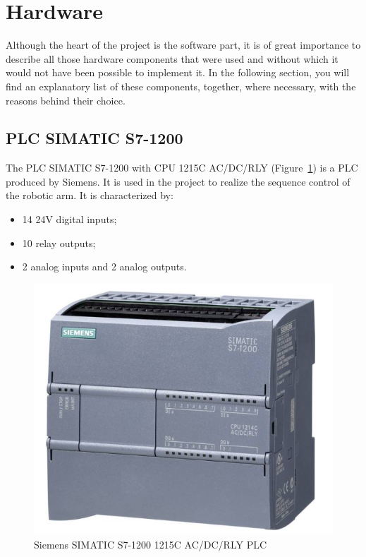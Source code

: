 \documentclass[a4paper,11pt]{report}
\theoremstyle{definition}
\theoremstyle{plain}
\begin{document}
    \section{Hardware}
        Although the heart of the project is the software part, it is of great importance to describe all those hardware components that were used and without which it would not have been possible to implement it. In the following section, you will find an explanatory list of these components, together, where necessary, with the reasons behind their choice.
        \subsection{PLC SIMATIC S7-1200}
            The PLC SIMATIC S7-1200 with CPU 1215C AC/DC/RLY (Figure~\ref{plc}) is a PLC produced by Siemens. It is used in the project to realize the sequence control of the robotic arm.
            It is characterized by:
            \begin{itemize}
                \item 14 24V digital inputs;
                \item 10 relay outputs;
                \item 2 analog inputs and 2 analog outputs.
            \end{itemize}
            \begin{figure}[H] %
                \includegraphics[scale=0.38]{images/plc.png}
                \centering
                \caption{Siemens SIMATIC S7-1200 1215C AC/DC/RLY PLC}
                \label{plc}
            \end{figure}
\end{document}
